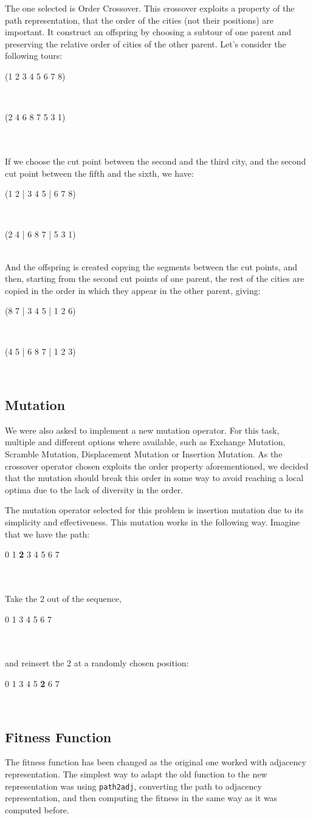   The one selected is Order Crossover. This crossover exploits a property of the path representation, that the order of the cities (not their positions) are important. It construct an offspring by choosing a subtour of one parent and preserving the relative order of cities of the other parent.
  Let's consider the following tours:
  \\
\centerline{(1 2 3 4 5 6 7 8)}\\
\centerline{(2 4 6 8 7 5 3 1)}\\
\\
If we choose the cut point between the second and the third city, and the second cut point between the fifth and the sixth, we have:\\
\centerline{(1 2 | 3 4 5 | 6 7 8)}\\
\centerline{(2 4 | 6 8 7 | 5 3 1)}\\

And the offspring is created copying the segments between the cut points, and then, starting from the second cut points of one parent, the rest of the cities are copied in the order in which they appear in the other parent, giving: \\
\centerline{(8 7 | 3 4 5 | 1 2 6)}\\
\centerline{(4 5 | 6 8 7 | 1 2 3)}\\

\subsection{Mutation}
We were also asked to implement a new mutation operator. For this task, multiple and different options where available, such as Exchange Mutation, Scramble Mutation, Displacement Mutation or Insertion Mutation.
As the crossover operator chosen exploits the order property aforementioned, we decided that the mutation should break this order in some way to avoid reaching a local optima due to the lack of diversity in the order.

The mutation operator selected for this problem is insertion mutation due to its simplicity and effectiveness. This mutation works in the following way. Imagine that we have the path:
\\
\centerline{0 1 \textbf{2} 3 4 5 6 7}\\
\\
Take the 2 out of the sequence,
\\
\centerline{0 1 3 4 5 6 7}\\
\\
and reinsert the 2 at a randomly chosen position:
\\
\centerline{0 1 3 4 5 \textbf{2} 6 7}\\


\subsection{Fitness Function}
The fitness function has been changed as the original one worked with adjacency representation. The simplest way to adapt the old function to the new representation was using \texttt{path2adj}, converting the path to adjacency representation, and then computing the fitness in the same way as it was computed before.
